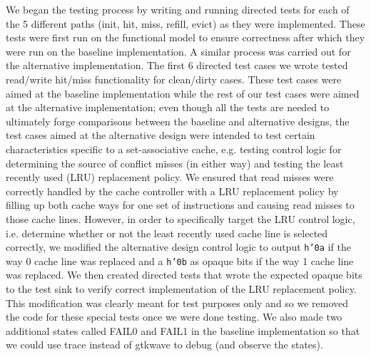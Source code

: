 \documentclass[10pt]{article}
\begin{document}
We began the testing process by writing and running directed tests for each of the 5 different paths (init, hit, miss, refill, evict) as they were implemented. These tests were first run on the functional model to ensure correctness after which they were run on the baseline implementation. A similar process was carried out for the alternative implementation. The first 6 directed test cases we wrote tested read/write hit/miss functionality for clean/dirty cases. These test cases were aimed at the baseline implementation while the rest of our test cases were aimed at the alternative implementation; even though all the tests are needed to ultimately forge comparisons between the baseline and alternative designs, the test cases aimed at the alternative design were intended to test certain characteristics specific to a set-associative cache, e.g. testing control logic for determining the source of conflict misses (in either way) and testing the least recently used (LRU) replacement policy. We ensured that read misses were correctly handled by the cache controller with a LRU replacement policy by filling up both cache ways for one set of instructions and causing read misses to those cache lines. However, in order to specifically target the LRU control logic, i.e. determine whether or not the least recently used cache line is selected correctly, we modified the alternative design control logic to output \texttt{h'0a} if the way 0 cache line was replaced and a \texttt{h'0b} as opaque bits if the way 1 cache line was replaced. We then created directed tests that wrote the expected opaque bits to the test sink to verify correct implementation of the LRU replacement policy. This modification was clearly meant for test purposes only and so we removed the code for these special tests once we were done testing. We also made two additional states called FAIL0 and FAIL1 in the baseline implementation so that we could use trace instead of gtkwave to debug (and observe the states). \\
\end{document}
